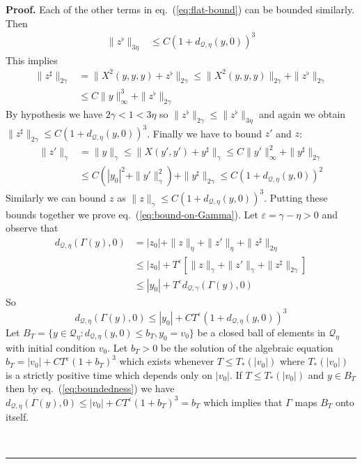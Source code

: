 \documentclass[a4paper,12pt,reqno]{article}
\newcommand{\eps}{\varepsilon}
\newcommand{\QQ}{\mathcal{Q}}
\newenvironment{proof}[1][Proof]{\textbf{#1.} }{\ \rule{0.5em}{0.5em}}
\begin{document}
\begin{proof}
 Each of the
other terms in eq.~(\ref{eq:flat-bound}) can be bounded similarly.
 Then 
\begin{equation}
\label{eq:flat-bound-final}
  \begin{split}
\|z^{\flat}\|_{3\eta} & \le C (1+d_{\QQ,\eta}(y,0))^3
  \end{split}
\end{equation}
This implies 
\begin{equation*}
  \begin{split}
\|z^\sharp\|_{2\gamma} & = \|X^2(y,y,y) + z^\flat\|_{2\gamma}   
 \le \|X^2(y,y,y)\|_{2\gamma} + \|z^\flat\|_{2\gamma}
\\ & \le C \|y\|_{\infty}^3 + \|z^\flat\|_{2\gamma}     
  \end{split}
\end{equation*}
By hypothesis we have $2\gamma < 1 < 3\eta$ so $\|z^\flat\|_{2\gamma}
\le  \|z^\flat\|_{3\eta}$ and again we obtain
$
\|z^\sharp\|_{2\gamma} \le C (1+d_{\QQ,\eta}(y,0))^3
$.
Finally we have to bound $z'$ and $z$:
\begin{equation*}
  \begin{split}
\|z'\|_{\gamma} & = \|y\|_{\gamma} \le \|X(y',y')+y^\sharp\|_{\gamma} \le
C \|y'\|_{\infty}^2 + \|y^\sharp\|_{2\gamma}
\\  & \le
C (|y_0|^2 + \|y'\|_{\gamma}^2) + \|y^\sharp\|_{2\gamma}
\le C (1+d_{\QQ,\eta}(y,0))^2    
  \end{split}
\end{equation*}
Similarly we can bound $z$ as $\|z\|_\gamma \le C
(1+d_{\QQ,\eta}(y,0))^3$.
Putting these bounds together we prove eq.~(\ref{eq:bound-on-Gamma}).
Let $\eps = \gamma-\eta > 0$ and observe that
\begin{equation*}
  \begin{split}
    d_{\QQ,\eta}(\Gamma(y),0) &= |z_0| +
    \|z\|_\eta+\|z'\|_{\eta}+\|z^\sharp\|_{2\eta} 
\\ & \le |z_0| +
     T^\eps\left[ \|z\|_\gamma+\|z'\|_{\gamma}+\|z^\sharp\|_{2\gamma}\right]
\\ & \le |y_0| +
     T^\eps d_{\QQ,\gamma}(\Gamma(y),0)
  \end{split}
\end{equation*}
So 
\begin{equation}
\label{eq:boundedness}
    d_{\QQ,\eta}(\Gamma(y),0) \le |y_0|+ C T^\eps (1+d_{\QQ,\eta}(y,0))^3
\end{equation}
Let $B_T = \{ y \in \QQ_{\eta} : d_{\QQ,\eta}(y,0) \le b_T, y_0 = v_0
\}$ be a closed ball of elements in $\QQ_{\eta}$ with initial
condition $v_0$. Let $b_T > 0$ be the solution of the algebraic equation
$
b_T = |v_0|+ C T^\eps (1+b_T)^3
$
which exists whenever $T \le T_*(|v_0|)$ where $T_*(|v_0|)$ is a
strictly positive time which depends only on $|v_0|$. 
If $T \le T_*(|v_0|)$ and $y \in B_T$ then by eq.~(\ref{eq:boundedness}) we have
$
d_{\QQ,\eta}(\Gamma(y),0) \le |v_0| + C T^\eps (1+b_T)^3 = b_T
$    
which implies that $\Gamma$ maps $B_T$ onto itself.


\end{proof}
\end{document}
